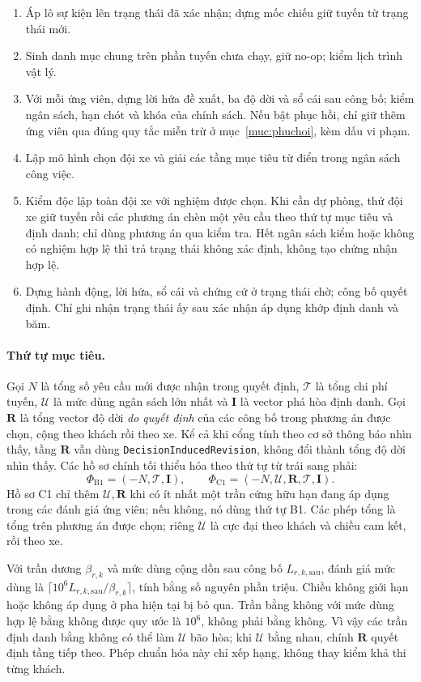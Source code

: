 \begin{enumerate}[leftmargin=1.2cm,itemsep=2pt,topsep=3pt]
\item Áp lô sự kiện lên trạng thái đã xác nhận; dựng mốc chiếu giữ tuyến từ trạng thái mới.
\item Sinh danh mục chung trên phần tuyến chưa chạy, giữ no-op; kiểm lịch trình vật lý.
\item Với mỗi ứng viên, dựng lời hứa đề xuất, ba độ dời và sổ cái sau công bố; kiểm
ngân sách, hạn chót và khóa của chính sách. Nếu bật phục hồi, chỉ giữ thêm ứng viên
qua đúng quy tắc miễn trừ ở mục~\ref{muc:phuchoi}, kèm dấu vi phạm.
\item Lập mô hình chọn đội xe và giải các tầng mục tiêu từ điển trong ngân sách công việc.
\item Kiểm độc lập toàn đội xe với nghiệm được chọn. Khi cần dự phòng, thử đội xe
giữ tuyến rồi các phương án chèn một yêu cầu theo thứ tự mục tiêu và định danh;
chỉ dùng phương án qua kiểm tra. Hết ngân sách kiểm hoặc không có nghiệm hợp lệ
thì trả trạng thái không xác định, không tạo chứng nhận hợp lệ.
\item Dựng hành động, lời hứa, sổ cái và chứng cứ ở trạng thái chờ; công bố quyết định.
Chỉ ghi nhận trạng thái ấy sau xác nhận áp dụng khớp định danh và băm.
\end{enumerate}

\paragraph{Thứ tự mục tiêu.}
Gọi $N$ là tổng số yêu cầu mới được nhận trong quyết định, $\mathcal{T}$ là tổng chi phí
tuyến, $\mathcal{U}$ là mức dùng ngân sách lớn nhất và $\mathbf{I}$ là vector phá hòa
định danh. Gọi $\mathbf{R}$ là tổng vector
độ dời \emph{do quyết định} của các công bố trong phương án được chọn, cộng theo khách
rồi theo xe. Kể cả khi cổng tính theo cơ sở thông báo nhìn thấy, tầng $\mathbf{R}$ vẫn
dùng \texttt{DecisionInducedRevision}, không đổi thành tổng độ dời nhìn thấy.
Các hồ sơ chính tối thiểu hóa theo thứ tự từ trái sang phải:
\[
\Phi_{\mathrm{B1}}=(-N,\mathcal{T},\mathbf{I}),\qquad
\Phi_{\mathrm{C1}}=(-N,\mathcal{U},\mathbf{R},\mathcal{T},\mathbf{I}).
\]
Hồ sơ C1 chỉ thêm $\mathcal{U},\mathbf{R}$ khi có ít nhất một trần cứng hữu hạn đang áp dụng
trong các đánh giá ứng viên; nếu không, nó dùng thứ tự B1. Các phép tổng là tổng trên
phương án được chọn; riêng $\mathcal{U}$ là cực đại theo khách và chiều cam kết, rồi theo xe.

Với trần dương $\beta_{r,k}$ và mức dùng cộng dồn sau công bố $L_{r,k,\mathrm{sau}}$,
đánh giá mức dùng là
$\lceil10^6 L_{r,k,\mathrm{sau}}/\beta_{r,k}\rceil$, tính bằng số nguyên phần triệu.
Chiều không giới hạn hoặc không áp dụng ở pha hiện tại bị bỏ qua. Trần bằng không
với mức dùng hợp lệ bằng không được quy ước là $10^6$, không phải bằng không.
Vì vậy các trần định danh bằng không có thể làm $\mathcal{U}$ bão hòa; khi $\mathcal{U}$ bằng nhau,
chính $\mathbf{R}$ quyết định tầng tiếp theo. Phép chuẩn hóa này chỉ xếp hạng, không
thay kiểm khả thi từng khách.

